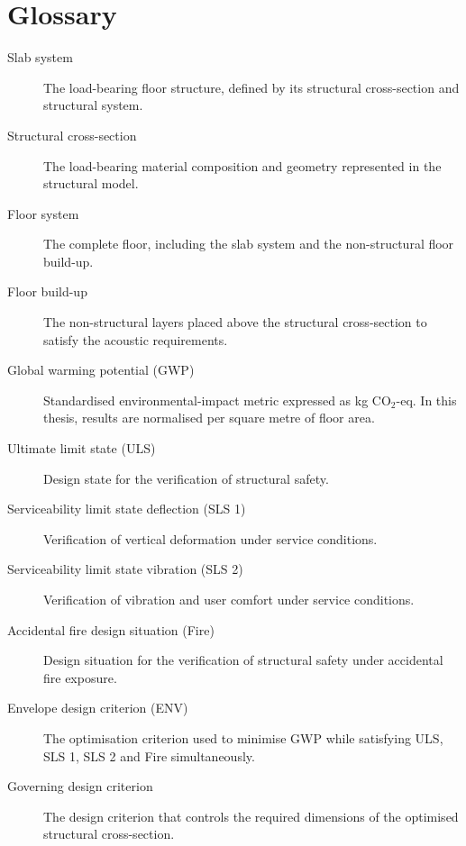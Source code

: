 \chapter*{Glossary}

\begin{description}
    \item[Slab system]
    The load-bearing floor structure, defined by its structural cross-section and structural system.

    \item[Structural cross-section]
    The load-bearing material composition and geometry represented in the structural model.

    \item[Floor system]
    The complete floor, including the slab system and the non-structural floor build-up.

    \item[Floor build-up]
    The non-structural layers placed above the structural cross-section to satisfy the acoustic requirements.

    \item[Global warming potential (GWP)]
    Standardised environmental-impact metric expressed as kg CO$_2$-eq. In this thesis, results are normalised per square metre of floor area.

    \item[Ultimate limit state (ULS)]
    Design state for the verification of structural safety.

    \item[Serviceability limit state deflection (SLS 1)]
    Verification of vertical deformation under service conditions.

    \item[Serviceability limit state vibration (SLS 2)]
    Verification of vibration and user comfort under service conditions.

    \item[Accidental fire design situation (Fire)]
    Design situation for the verification of structural safety under accidental fire exposure.

    \item[Envelope design criterion (ENV)]
    The optimisation criterion used to minimise GWP while satisfying ULS, SLS 1, SLS 2 and Fire simultaneously.

    \item[Governing design criterion]
    The design criterion that controls the required dimensions of the optimised structural cross-section.


\end{description}
